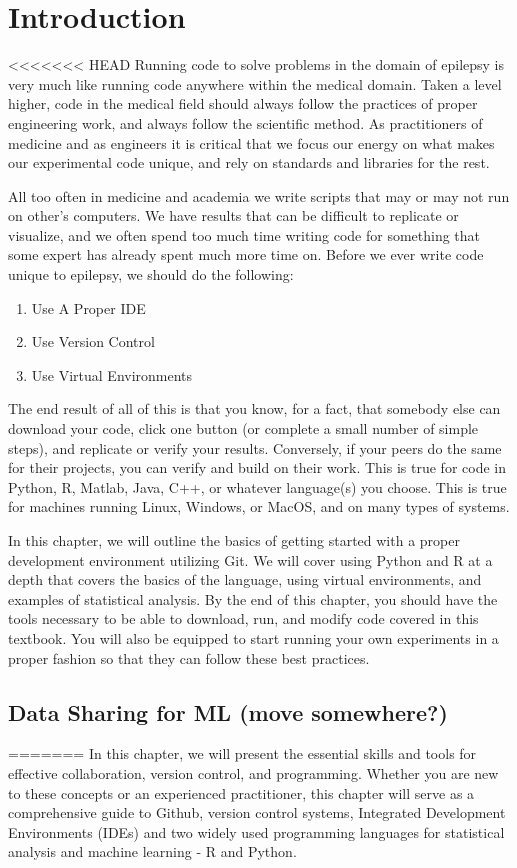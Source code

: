\section{Introduction}
<<<<<<< HEAD
Running code to solve problems in the domain of epilepsy is very much like running code anywhere within the medical domain.
Taken a level higher, code in the medical field should always follow the practices of proper engineering work, and always follow the scientific method.
As practitioners of medicine and as engineers it is critical that we focus our energy on what makes our experimental code unique, and rely on standards and libraries for the rest.

All too often in medicine and academia we write scripts that may or may not run on other's computers.
We have results that can be difficult to replicate or visualize, and we often spend too much time writing code for something that some expert has already spent much more time on.
Before we ever write code unique to epilepsy, we should do the following:
\begin{enumerate}
    \item Use A Proper IDE
    \item Use Version Control
    \item Use Virtual Environments
\end{enumerate}

The end result of all of this is that you know, for a fact, that somebody else can download your code, click one button (or complete a small number of simple steps), and replicate or verify your results.
Conversely, if your peers do the same for their projects, you can verify and build on their work.
This is true for code in Python, R, Matlab, Java, C++, or whatever language(s) you choose.
This is true for machines running Linux, Windows, or MacOS, and on many types of systems.

In this chapter, we will outline the basics of getting started with a proper development environment utilizing Git.
We will cover using Python and R at a depth that covers the basics of the language, using virtual environments, and examples of statistical analysis.
By the end of this chapter, you should have the tools necessary to be able to download, run, and modify code covered in this textbook.
You will also be equipped to start running your own experiments in a proper fashion so that they can follow these best practices.

\subsection{Data Sharing for ML (move somewhere?)}
=======
In this chapter, we will present the essential skills and tools for effective collaboration, version control, and programming. Whether you are new to these concepts or an experienced practitioner, this chapter will serve as a comprehensive guide to Github, version control systems, Integrated Development Environments (IDEs) and two widely used programming languages for statistical analysis and machine learning - R and Python.

